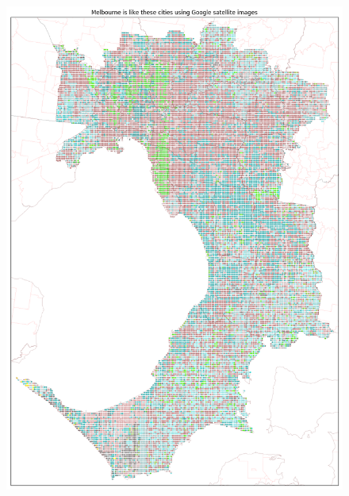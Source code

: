 \documentclass[sageh,times]{sagej}
\begin{document}
\begin{figure}[!htbp]
\centering    
\includegraphics[scale=0.20]{Images/MelbourneOverall_sat.png} 

\end{figure}
\end{document}
